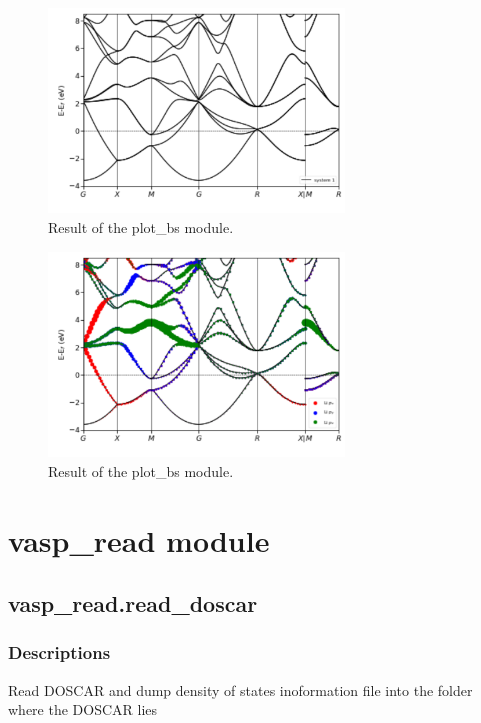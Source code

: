 \documentclass[12pt]{book}
\begin{document}
\begin{figure}[htbp]
\centering
\includegraphics[width=0.7\textwidth]{fig_20201208_21-57-28_band.pdf}
\caption{Result of the plot\_bs module.}
\label{fig:bs_li}
\end{figure}

\begin{figure}[htbp]
\centering
\includegraphics[width=0.7\textwidth]{fig_20201208_21-59-17_band.pdf}
\caption{Result of the plot\_bs module.}
\label{fig:fatband_li}
\end{figure}

\section{vasp\_read module}

\subsection{vasp\_read.read\_doscar}

\subsubsection{Descriptions}
Read DOSCAR and dump density of states inoformation file into the folder where the DOSCAR lies
\end{document}
